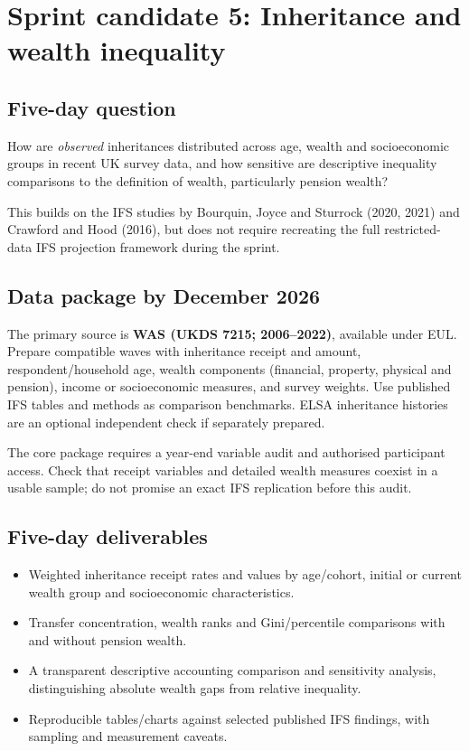 \section{Sprint candidate 5: Inheritance and wealth inequality}
\label{sec:ifs}

\subsection{Five-day question}
How are \emph{observed} inheritances distributed across age, wealth and socioeconomic groups in recent UK survey data, and how sensitive are descriptive inequality comparisons to the definition of wealth, particularly pension wealth?

This builds on the IFS studies by Bourquin, Joyce and Sturrock (2020, 2021) and Crawford and Hood (2016), but does not require recreating the full restricted-data IFS projection framework during the sprint.

\subsection{Data package by December 2026}
The primary source is \textbf{WAS (UKDS 7215; 2006--2022)}, available under EUL. Prepare compatible waves with inheritance receipt and amount, respondent/household age, wealth components (financial, property, physical and pension), income or socioeconomic measures, and survey weights. Use published IFS tables and methods as comparison benchmarks. ELSA inheritance histories are an optional independent check if separately prepared.

The core package requires a year-end variable audit and authorised participant access. Check that receipt variables and detailed wealth measures coexist in a usable sample; do not promise an exact IFS replication before this audit.

\subsection{Five-day deliverables}
\begin{itemize}[nosep]
\item Weighted inheritance receipt rates and values by age/cohort, initial or current wealth group and socioeconomic characteristics.
\item Transfer concentration, wealth ranks and Gini/percentile comparisons with and without pension wealth.
\item A transparent descriptive accounting comparison and sensitivity analysis, distinguishing absolute wealth gaps from relative inequality.
\item Reproducible tables/charts against selected published IFS findings, with sampling and measurement caveats.
\end{itemize}

